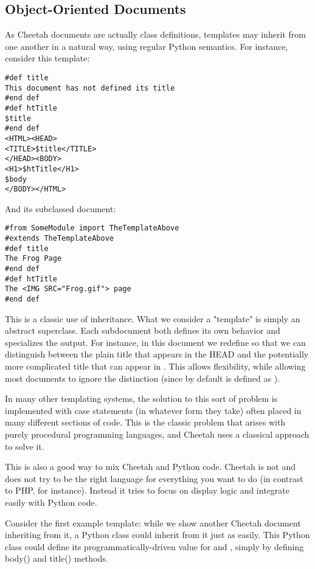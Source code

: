 \subsection{Object-Oriented Documents}
\label{howWorks.objoriented}

As Cheetah documents are actually class definitions, templates may inherit from
one another in a natural way, using regular Python semantics. For instance,
consider this template:

\begin{verbatim}
#def title
This document has not defined its title
#end def
#def htTitle
$title
#end def
<HTML><HEAD>
<TITLE>$title</TITLE>
</HEAD><BODY>
<H1>$htTitle</H1>
$body
</BODY></HTML>
\end{verbatim}

And its subclassed document:
\begin{verbatim}
#from SomeModule import TheTemplateAbove
#extends TheTemplateAbove
#def title
The Frog Page
#end def
#def htTitle
The <IMG SRC="Frog.gif"> page
#end def
\end{verbatim}

This is a classic use of inheritance. What we consider a "template" is simply an
abstract superclass. Each subdocument both defines its own behavior and
specializes the output. For instance, in this document we redefine
 so that we can distinguish between the plain title that appears
in the HEAD and the potentially more complicated title that can appear in
.  This allows flexibility, while allowing most documents to ignore the
distinction (since by default  is defined as ).

In many other templating systems, the solution to this sort of problem is
implemented with case statements (in whatever form they take) often placed in
many different sections of code. This is the classic problem that arises with
purely procedural programming languages, and Cheetah uses a classical approach
to solve it.

This is also a good way to mix Cheetah and Python code. Cheetah is not and does
not try to be the right language for everything you want to do (in contrast to
PHP, for instance). Instead it tries to focus on display logic and integrate
easily with Python code.

Consider the first example template: while we show another Cheetah document
inheriting from it, a Python class could inherit from it just as easily. This
Python class could define its programmatically-driven value for 
and , simply by defining body() and title() methods.

